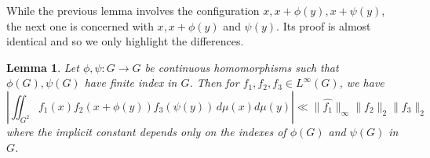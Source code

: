\documentclass[10pt]{article}
\newtheorem{lemma}[lemma]{Lemma}
\theoremstyle{definition}
\begin{document}
While the previous lemma involves the configuration $x, x + \phi(y), x + \psi(y)$, the next one is concerned with $x, x + \phi(y)$ and $\psi(y)$. Its proof is almost identical and so we only highlight the differences. 

\begin{lemma} \label{lem:counting2}
 Let $\phi, \psi: G \rightarrow G$ be continuous homomorphisms such that $\phi(G), \psi(G)$ have finite index in $G$. Then for $f_1, f_2, f_3 \in L^\infty(G)$, we have
\begin{equation} 
\left| \iint_{G^2} f_1(x) f_2(x+ \phi(y))f_3(\psi(y)) \, d\mu(x) d\mu(y) \right| \ll \| \widehat{f_1} \|_{\infty} \|f_2 \|_2 \| f_3\|_2 
\end{equation}
where the implicit constant depends only on the indexes of $\phi(G)$ and $\psi(G)$ in $G$.
\end{lemma}
\end{document}
